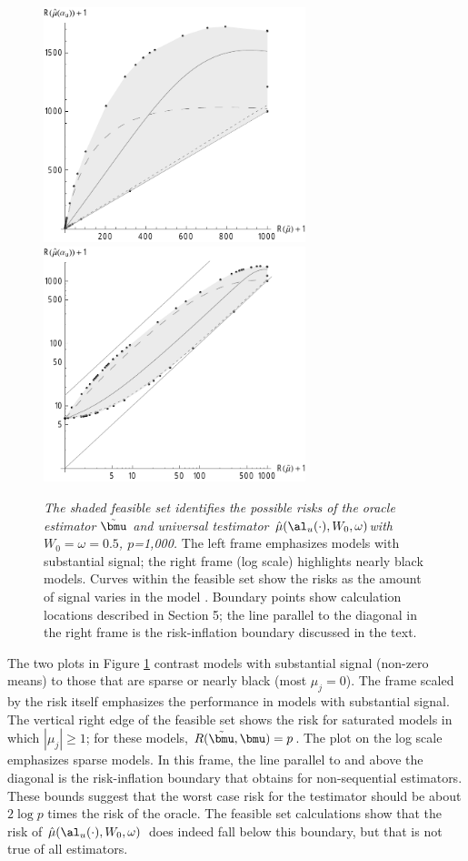 \documentclass{gSCS2e}
\newcommand{\uTest}{\mbox{$\hat\mu(\al_u(\cdot),W_0,\omega)$}}
\begin{document}
 \begin{figure}
 \caption{ \label{fig:riFeasibleSet} {\sl The shaded feasible set identifies the possible
 risks of the oracle estimator $\tilde{\bmu}$ and universal testimator \uTest with
 $W_0=\omega=0.5$, $p$=1,000.} The left frame emphasizes models with substantial signal;
 the right frame (log scale) highlights nearly black models. Curves within the feasible
 set show the risks as the amount of signal varies in the model . Boundary points
 show calculation locations described in Section 5; the line parallel to the diagonal in
 the right frame is the risk-inflation boundary discussed in the text.}

 \vspace{0.1in}
\centerline{
 \includegraphics[width=3.0in]{figures/riFeasSet_bw}
 \includegraphics[width=3.0in]{figures/riFeasSetLog_bw} }
 \vspace{0.2in}
 \end{figure}


 The two plots in Figure \ref{fig:riFeasibleSet} contrast models with substantial signal
 (non-zero means) to those that are sparse or nearly black (most $\mu_j=0$).  The frame
 scaled by the risk itself emphasizes the performance in models with substantial signal.
  The vertical right edge of the feasible set shows the risk for saturated models in which
 $|\mu_j| \ge 1$; for these models, $R(\tilde{\bmu}, \bmu) = p$.  The plot on the log
 scale emphasizes sparse models.  In this frame, the line parallel to and above the
 diagonal is the risk-inflation boundary  that obtains for non-sequential
 estimators.  These bounds suggest that the worst case risk for the testimator should be
 about $2 \log p$ times the risk of the oracle.  The feasible set calculations show that
 the risk of \uTest\ does indeed fall below this boundary, but that is not true of all
 estimators.
\end{document}
